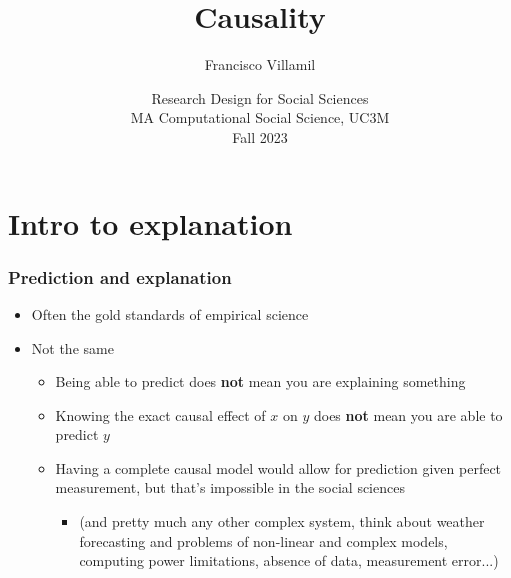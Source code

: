 \documentclass[aspectratio=43]{beamer}
\title[Lecture 3: Causality]{\Large Causality}
\author[]{Francisco Villamil}
\date[]{Research Design for Social Sciences\\MA Computational Social Science, UC3M\\Fall 2023}
\begin{document}

\begin{frame}
  \titlepage
\end{frame}

%
%

\section{Intro to explanation}

\begin{frame}
\frametitle{Prediction and explanation}
\centering

\begin{itemize}
  \item Often the gold standards of empirical science
  \item Not the same
  \begin{itemize}
    \item Being able to predict does \textbf{not} mean you are explaining something
    \item Knowing the exact causal effect of $x$ on $y$ does \textbf{not} mean you are able to predict $y$
    \item Having a complete causal model would allow for prediction given perfect measurement, but that's impossible in the social sciences
    \begin{itemize}
      \item[] (and pretty much any other complex system, think about weather forecasting and problems of non-linear and complex models, computing power limitations, absence of data, measurement error...)
    \end{itemize}
  \end{itemize}
\end{itemize}

\end{frame}
\end{document}
